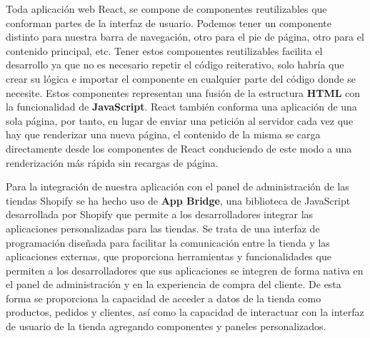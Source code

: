 \documentclass[12pt]{article}
\begin{document}
Toda aplicación web React, se compone de componentes reutilizables que conforman partes de la interfaz de usuario. Podemos tener un componente distinto para
nuestra barra de navegación, otro para el pie de página, otro para el contenido principal, etc.
Tener estos componentes reutilizables facilita el desarrollo ya que no es necesario repetir el código reiterativo, solo habría que crear su lógica e
importar el componente en cualquier parte del código donde se necesite. Estos componentes representan una fusión de la estructura \textbf{HTML} con la funcionalidad de \textbf{JavaScript}.
React también conforma una aplicación de una sola página, por tanto, en lugar de enviar una petición al servidor cada vez que hay que renderizar una nueva página,
el contenido de la misma se carga directamente desde los componentes de React conduciendo de este modo a una renderización más rápida sin recargas de página. \cite{react-pag-2}

Para la integración de nuestra aplicación con el panel de administración de las tiendas Shopify se ha hecho uso de \textbf{App Bridge}, una biblioteca de JavaScript
desarrollada por Shopify que permite a los desarrolladores integrar las aplicaciones personalizadas para las tiendas. Se trata de una interfaz
de programación diseñada para facilitar la comunicación entre la tienda y las aplicaciones externas, que proporciona herramientas y funcionalidades
que permiten a los desarrolladores que sus aplicaciones se integren de forma nativa en el panel de administración y en la experiencia de compra
del cliente. De esta forma se proporciona la capacidad de acceder a datos de la tienda como productos, pedidos y clientes, así como la capacidad de interactuar con la interfaz
de usuario de la tienda agregando componentes y paneles personalizados. \cite{shopify-dev}
\end{document}
